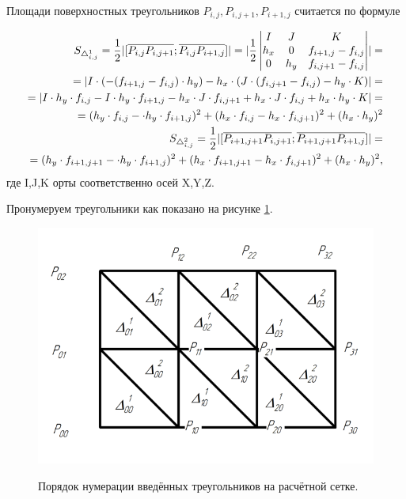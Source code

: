 \documentclass{article}
\begin{document}
Площади поверхностных треугольников $P_{i,j}, P_{i,j+1}, P_{i+1,j}$ считается по формуле 

\begin{align}\label{eq:triangle_square}
S_{\triangle_{i,j}^1} = \frac{1}{2} \lvert [\overline{P_{i,j}P_{i,j+1}};\overline{P_{i,j}P_{i+1,j}}] \rvert = \lvert \frac{1}{2} 
\begin{vmatrix}
  I & J & K \\
  h_x & 0 & f_{i+1,j}-f_{i,j} \\
  0 & h_y & f_{i,j+1}-f_{i,j}
\end{vmatrix}
\rvert
= \notag \\
= \lvert I \cdot (-(f_{i+1,j}-f_{i,j}) \cdot h_y) - h_x \cdot (J \cdot (f_{i,j+1}-f_{i,j}) - h_y \cdot K) \rvert = \notag \\
= \lvert I \cdot h_y \cdot f_{i,j} -I \cdot h_y \cdot f_{i+1,j} - h_x \cdot J \cdot f_{i,j+1}+ h_x \cdot J \cdot f_{i,j} + h_x \cdot h_y \cdot K \rvert = \notag \\
= (h_y \cdot f_{i,j} - \cdot h_y \cdot f_{i+1,j})^2 + (h_x \cdot f_{i,j} - h_x \cdot f_{i,j+1})^2 + (h_x \cdot h_y)^2 \\
S_{\triangle_{i,j}^2} = \frac{1}{2} \lvert [\overline{P_{i+1,j+1}P_{i,j+1}};\overline{P_{i+1,j+1}P_{i+1,j}}] \rvert = \notag \\
= (h_y \cdot f_{i+1,j+1} - \cdot h_y \cdot f_{i+1,j})^2 + (h_x \cdot f_{i+1,j+1} - h_x \cdot f_{i,j+1})^2 + (h_x \cdot h_y)^2,
\end{align}
где I,J,K орты соответственно осей X,Y,Z.

Пронумеруем треугольники как показано на рисунке \ref{fig:triangle_numeration}.

\begin{figure}[H]
\centering
\includegraphics[width=0.8\linewidth]{triangle_numeration.png}
\caption{}
\label{fig:triangle_numeration}
Порядок нумерации введённых треугольников на расчётной сетке.
\end{figure}
\end{document}
